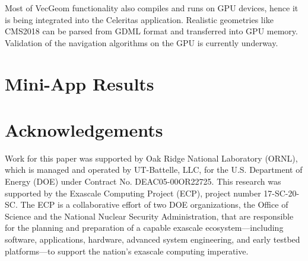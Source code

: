 \documentclass{webofc}
\begin{document}
Most of VecGeom functionality also compiles and runs on GPU devices, hence it is being 
integrated into the Celeritas application. Realistic geometries like CMS2018 can be parsed 
from GDML format and transferred into GPU memory. Validation of the navigation algorithms
on the GPU is currently underway. 


\section{Mini-App Results}
\label{sec:miniapp}

\section{Acknowledgements}

Work for this paper was supported by Oak Ridge National Laboratory (ORNL), which is managed and operated by UT-Battelle, LLC, for the U.S. Department of Energy (DOE) under Contract No. DEAC05-00OR22725.
This research was supported by the Exascale Computing
Project (ECP), project number 17-SC-20-SC. The ECP is a collaborative effort of
two DOE organizations, the Office of Science and the National Nuclear Security
Administration, that are responsible for the planning and preparation of a
capable exascale ecosystem---including software, applications, hardware,
advanced system engineering, and early testbed platforms---to support the
nation's exascale computing imperative.


\end{document}
